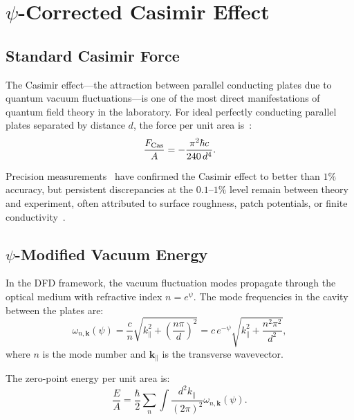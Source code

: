 \documentclass[aps,prb,twocolumn,superscriptaddress,floatfix,nofootinbib,longbibliography]{revtex4-2}
\begin{document}
\section{$\psi$-Corrected Casimir Effect}\label{sec:casimir}

\subsection{Standard Casimir Force}

The Casimir effect---the attraction between parallel conducting plates
due to quantum vacuum fluctuations---is one of the most direct
manifestations of quantum field theory in the laboratory.  For ideal
perfectly conducting parallel plates separated by distance $d$, the force
per unit area is~\cite{Casimir1948}:
\begin{equation}
\frac{F_{\rm Cas}}{A} = -\frac{\pi^2\hbar c}{240\,d^4}.
\label{eq:casimir-standard}
\end{equation}

Precision measurements~\cite{Lamoreaux1997,Mohideen1998,Decca2003,
Decca2005,Chang2012} have confirmed the Casimir effect to better than
$1\%$ accuracy, but persistent discrepancies at the $0.1$--$1\%$ level
remain between theory and experiment, often attributed to surface
roughness, patch potentials, or finite
conductivity~\cite{Klimchitskaya2009,Bordag2009}.

\subsection{$\psi$-Modified Vacuum Energy}

In the DFD framework, the vacuum fluctuation modes propagate through the
optical medium with refractive index $n = e^\psi$.  The mode frequencies
in the cavity between the plates are:
\begin{equation}
\omega_{n,\mathbf{k}}(\psi) = \frac{c}{n}\sqrt{k_\parallel^2
+ \left(\frac{n\pi}{d}\right)^2}
= c\,e^{-\psi}\sqrt{k_\parallel^2 + \frac{n^2\pi^2}{d^2}},
\label{eq:modes-psi}
\end{equation}
where $n$ is the mode number and $\mathbf{k}_\parallel$ is the
transverse wavevector.

The zero-point energy per unit area is:
\begin{equation}
\frac{E}{A} = \frac{\hbar}{2}\sum_n\int\frac{d^2k_\parallel}{(2\pi)^2}
\omega_{n,\mathbf{k}}(\psi).
\label{eq:zpe}
\end{equation}
\end{document}
